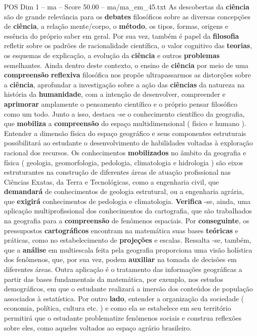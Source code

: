 \begin{textsample}{POS Dim 1 – ma – Score 50.00 – ma/ma\_em\_45.txt}
As descobertas da \textbf{ciência} são de grande relevância para os \textbf{debates} filosóficos sobre as diversas concepções de \textbf{ciência}, a relação mente/corpo, o \textbf{método}, os tipos, formas, origens e essência do próprio saber em geral.
Por sua vez, também é papel da \textbf{filosofia} refletir sobre os padrões de racionalidade científica, o valor cognitivo das \textbf{teorias}, os esquemas de explicação, a evolução da \textbf{ciência} e outros \textbf{problemas} semelhantes.
Ainda dentro deste contexto, o ensino de \textbf{ciência} por meio de uma \textbf{compreensão} \textbf{reflexiva} filosófica nos propõe ultrapassarmos as distorções sobre a \textbf{ciência}, aprofundar a investigação sobre a ação das \textbf{ciências} da natureza na história da \textbf{humanidade}, com a intenção de desenvolver, compreender e \textbf{aprimorar} amplamente o pensamento científico e o próprio pensar filosófico como um todo.
Junto a isso, destaca -se o conhecimento científico da geografia, que \textbf{mobiliza} a \textbf{compreensão} do espaço multidimensional ( físico e humano ).
Entender a dimensão física do espaço geográfico e seus componentes estruturais possibilitará ao estudante o desenvolvimento de habilidades voltadas à exploração racional dos recursos.
Os conhecimentos \textbf{mobilizados} no âmbito da geografia e física ( geologia, geomorfologia, pedologia, climatologia e hidrologia ) são eixos estruturantes na construção de diferentes áreas de atuação profissional nas Ciências Exatas, da Terra e Tecnológicas, como a engenharia civil, que \textbf{demandará} de conhecimentos de geologia estrutural, ou a engenharia agrária, que \textbf{exigirá} conhecimentos de pedologia e climatologia. \textbf{Verifica} -se, ainda, uma aplicação multiprofissional dos conhecimentos da cartografia, que são trabalhados na geografia para a \textbf{compreensão} de fenômenos espaciais.
Por \textbf{conseguinte}, os pressupostos \textbf{cartográficos} encontram na matemática suas bases \textbf{teóricas} e práticas, como no estabelecimento de \textbf{projeções} e escalas.
Ressalta -se, também, que a \textbf{análise} em multiescala feita pela geografia proporciona uma visão holística dos fenômenos, que, por sua vez, podem \textbf{auxiliar} na tomada de decisões em diferentes áreas.
Outra aplicação é o tratamento das informações geográficas a partir das bases fundamentais da matemática, por exemplo, nos estudos demográficos, em que o estudante realizará a imersão dos conteúdos de população associados à estatística.
Por outro \textbf{lado}, entender a organização da sociedade ( economia, política, cultura etc. ) e como ela se estabelece em seu território permitirá que o estudante problematize fenômenos sociais e construa reflexões sobre eles, como aqueles voltados ao espaço agrário brasileiro.

\end{textsample}
